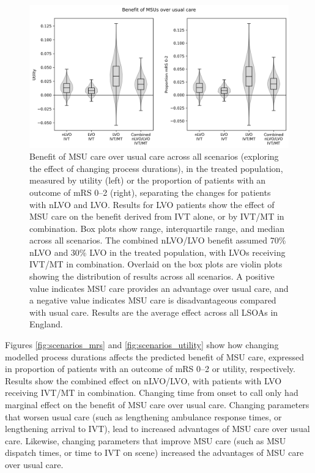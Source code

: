 \begin{figure}[h!]
    \centering
    \includegraphics[width=0.75\linewidth]{images/scenario_results_summary.png}
    \caption{Benefit of MSU care over usual care across all scenarios (exploring the effect of changing process durations), in the treated population, measured by utility (left) or the proportion of patients with an outcome of mRS 0--2 (right), separating the changes for patients with nLVO and LVO. Results for LVO patients show the effect of MSU care on the benefit derived from IVT alone, or by IVT/MT in combination. Box plots show range, interquartile range, and median across all scenarios. The combined nLVO/LVO benefit assumed 70\% nLVO and 30\% LVO in the treated population, with LVOs receiving IVT/MT in combination. Overlaid on the box plots are violin plots showing the distribution of results across all scenarios. A positive value indicates MSU care provides an advantage over usual care, and a negative value indicates MSU care is disadvantageous compared with usual care. Results are the average effect across all LSOAs in England.}
    \label{fig:scenarios_overview}
\end{figure}

Figures \ref{fig:scenarios_mrs}  and \ref{fig:scenarios_utility} show how changing modelled process durations affects the predicted benefit of MSU care, expressed in proportion of patients with an outcome of mRS 0--2 or utility, respectively. Results show the combined effect on nLVO/LVO, with patients with LVO receiving IVT/MT in combination. Changing time from onset to call only had marginal effect on the benefit of MSU care over usual care. Changing parameters that worsen usual care (such as lengthening ambulance response times, or lengthening arrival to IVT), lead to increased advantages of MSU care over usual care. Likewise, changing parameters that improve MSU care (such as MSU dispatch times, or time to IVT on scene) increased the advantages of MSU care over usual care.

